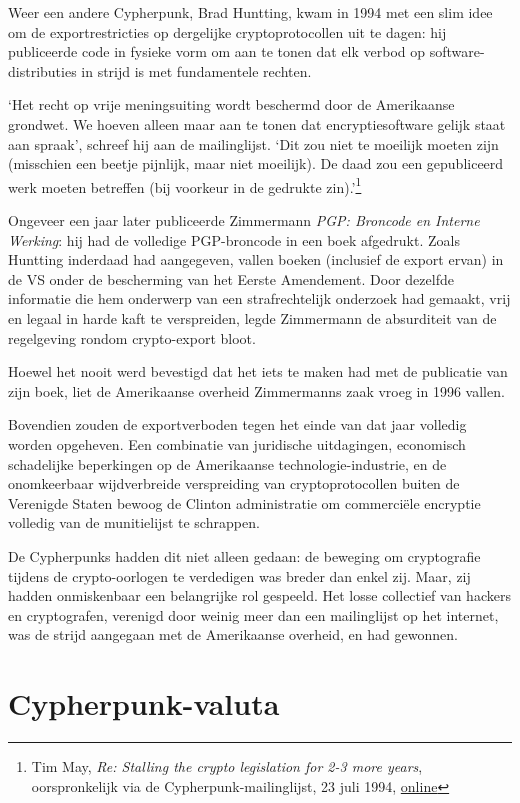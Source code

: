 \documentclass[
  a5paper,
  smalldemyvopaper,11pt,twoside,onecolumn,openright,extrafontsizes,
hidelinks]{memoir}
\begin{document}
Weer een andere Cypherpunk, Brad Huntting, kwam in 1994 met een slim
idee om de exportrestricties op dergelijke cryptoprotocollen uit te
dagen: hij publiceerde code in fysieke vorm om aan te tonen dat elk
verbod op software-distributies in strijd is met fundamentele rechten.

`Het recht op vrije meningsuiting wordt beschermd door de Amerikaanse
grondwet. We hoeven alleen maar aan te tonen dat encryptiesoftware
gelijk staat aan spraak', schreef hij aan de mailinglijst. `Dit zou niet
te moeilijk moeten zijn (misschien een beetje pijnlijk, maar niet
moeilijk). De daad zou een gepubliceerd werk moeten betreffen (bij
voorkeur in de gedrukte zin).'\footnote{Tim May, \emph{Re: Stalling the
  crypto legislation for 2-3 more years}, oorspronkelijk via de
  Cypherpunk-mailinglijst, 23 juli 1994,
  \href{https://cypherpunks.venona.com/date/1994/07/msg01245.html}{online}}

Ongeveer een jaar later publiceerde Zimmermann \emph{PGP: Broncode en
Interne Werking}: hij had de volledige PGP-broncode in een boek
afgedrukt. Zoals Huntting inderdaad had aangegeven, vallen boeken
(inclusief de export ervan) in de VS onder de bescherming van het Eerste
Amendement. Door dezelfde informatie die hem onderwerp van een
strafrechtelijk onderzoek had gemaakt, vrij en legaal in harde kaft te
verspreiden, legde Zimmermann de absurditeit van de regelgeving rondom
crypto-export bloot.

Hoewel het nooit werd bevestigd dat het iets te maken had met de
publicatie van zijn boek, liet de Amerikaanse overheid Zimmermanns zaak
vroeg in 1996 vallen.

Bovendien zouden de exportverboden tegen het einde van dat jaar volledig
worden opgeheven. Een combinatie van juridische uitdagingen, economisch
schadelijke beperkingen op de Amerikaanse technologie-industrie, en de
onomkeerbaar wijdverbreide verspreiding van cryptoprotocollen buiten de
Verenigde Staten bewoog de Clinton administratie om commerciële
encryptie volledig van de munitielijst te schrappen.

De Cypherpunks hadden dit niet alleen gedaan: de beweging om
cryptografie tijdens de crypto-oorlogen te verdedigen was breder dan
enkel zij. Maar, zij hadden onmiskenbaar een belangrijke rol gespeeld.
Het losse collectief van hackers en cryptografen, verenigd door weinig
meer dan een mailinglijst op het internet, was de strijd aangegaan met
de Amerikaanse overheid, en had gewonnen.

\chapter{Cypherpunk-valuta}\label{cypherpunk-valuta}
\end{document}
